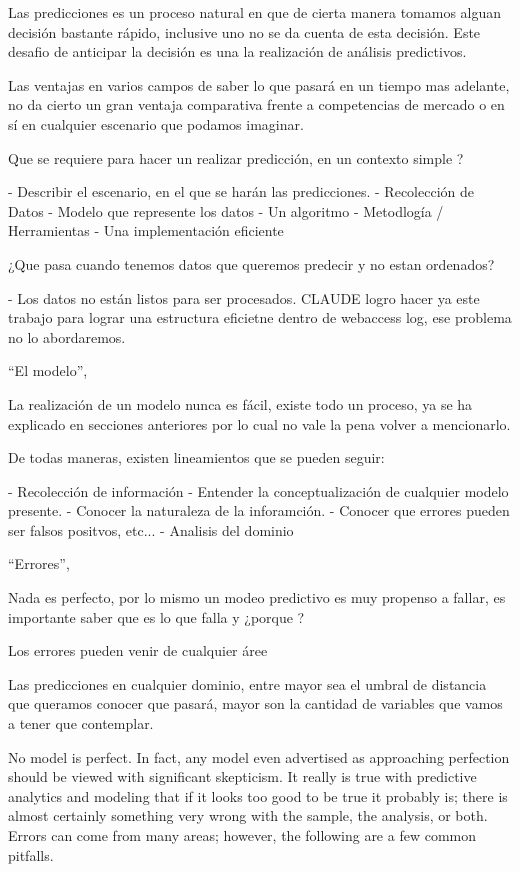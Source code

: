 

Las predicciones es un proceso natural en que de cierta manera tomamos alguan decisión bastante rápido, inclusive uno no se da cuenta de esta decisión. Este desafio de anticipar la decisión es una la realización de análisis predictivos.


Las ventajas en varios campos de saber lo que pasará en un tiempo mas adelante, no da cierto un gran ventaja comparativa frente a competencias de mercado o en sí en cualquier escenario que podamos imaginar.


Que se requiere para hacer un realizar predicción, en un contexto simple ?

- Describir el escenario, en el que se harán las predicciones.
- Recolección de Datos
- Modelo que represente los datos
- Un algoritmo
- Metodlogía / Herramientas
- Una implementación eficiente


¿Que pasa cuando tenemos datos que queremos predecir y no estan ordenados?

- Los datos no están listos para ser procesados. CLAUDE logro hacer ya este trabajo para lograr una estructura eficietne dentro de webaccess log, ese problema no lo abordaremos.





``El modelo'', 

La realización de un modelo nunca es fácil, existe todo un proceso, ya se ha explicado en secciones anteriores por lo cual no vale la pena volver a mencionarlo.

De todas maneras, existen lineamientos que se pueden seguir:

- Recolección de información
- Entender la conceptualización de cualquier modelo presente.
- Conocer la naturaleza de la inforamción.
- Conocer que errores pueden ser falsos positvos, etc...
- Analisis del dominio 



``Errores'',

Nada es perfecto, por lo mismo un modeo predictivo es muy propenso a fallar, es importante saber que es lo que falla y ¿porque ?

Los errores pueden venir de cualquier áree

Las predicciones en cualquier dominio, entre mayor sea el umbral de distancia que queramos conocer que pasará, mayor son la cantidad de variables que vamos a tener que contemplar.



No model is perfect. In fact, any model even advertised as approaching perfection should be viewed with significant skepticism. It really is true with predictive analytics and modeling that if it looks too good to be true it probably is; there is almost certainly something very wrong with the sample, the analysis, or both. Errors can come from many areas; however, the following are a few common pitfalls.


